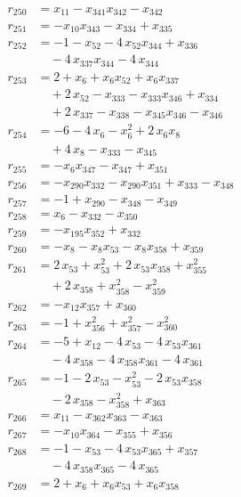 \begin{align*}
r_{250} &= x_{11} - x_{341} x_{342} - x_{342} \\
r_{251} &= -x_{10} x_{343} - x_{334} + x_{335} \\
r_{252} &= -1 - x_{52} - 4\,x_{52} x_{344} + x_{336} \\
&\quad{}- 4\,x_{337} x_{344} - 4\,x_{344} \\
r_{253} &= 2 + x_{6} + x_{6} x_{52} + x_{6} x_{337} \\
&\quad{}+ 2\,x_{52} - x_{333} - x_{333} x_{346} + x_{334} \\
&\quad{}+ 2\,x_{337} - x_{338} - x_{345} x_{346} - x_{346} \\
r_{254} &= -6 - 4\,x_{6} - x_{6}^{2} + 2\,x_{6} x_{8} \\
&\quad{}+ 4\,x_{8} - x_{333} - x_{345} \\
r_{255} &= -x_{6} x_{347} - x_{347} + x_{351} \\
r_{256} &= -x_{290} x_{332} - x_{290} x_{351} + x_{333} - x_{348} \\
r_{257} &= -1 + x_{290} - x_{348} - x_{349} \\
r_{258} &= x_{6} - x_{332} - x_{350} \\
r_{259} &= -x_{195} x_{352} + x_{332} \\
r_{260} &= -x_{8} - x_{8} x_{53} - x_{8} x_{358} + x_{359} \\
r_{261} &= 2\,x_{53} + x_{53}^{2} + 2\,x_{53} x_{358} + x_{355}^{2} \\
&\quad{}+ 2\,x_{358} + x_{358}^{2} - x_{359}^{2} \\
r_{262} &= -x_{12} x_{357} + x_{360} \\
r_{263} &= -1 + x_{356}^{2} + x_{357}^{2} - x_{360}^{2} \\
r_{264} &= -5 + x_{12} - 4\,x_{53} - 4\,x_{53} x_{361} \\
&\quad{}- 4\,x_{358} - 4\,x_{358} x_{361} - 4\,x_{361} \\
r_{265} &= -1 - 2\,x_{53} - x_{53}^{2} - 2\,x_{53} x_{358} \\
&\quad{}- 2\,x_{358} - x_{358}^{2} + x_{363} \\
r_{266} &= x_{11} - x_{362} x_{363} - x_{363} \\
r_{267} &= -x_{10} x_{364} - x_{355} + x_{356} \\
r_{268} &= -1 - x_{53} - 4\,x_{53} x_{365} + x_{357} \\
&\quad{}- 4\,x_{358} x_{365} - 4\,x_{365} \\
r_{269} &= 2 + x_{6} + x_{6} x_{53} + x_{6} x_{358} \\

\end{align*}
